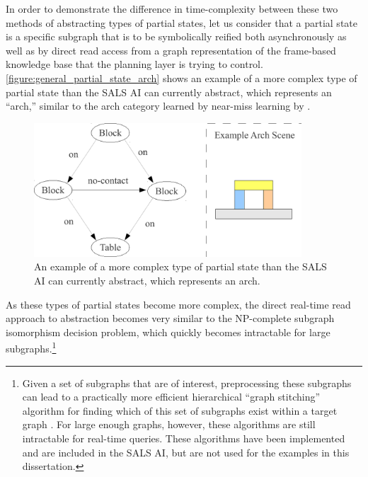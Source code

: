 In order to demonstrate the difference in time-complexity between
these two methods of abstracting types of partial states, let us
consider that a partial state is a specific subgraph that is to be
symbolically reified both asynchronously as well as by direct read
access from a graph representation of the frame-based knowledge base
that the planning layer is trying to control.
{\mbox{\autoref{figure:general_partial_state_arch}}} shows an example
of a more complex type of partial state than the SALS AI can currently
abstract, which represents an ``arch,'' similar to the arch category
learned by near-miss learning by \cite{winston:1970}.
\begin{figure}
\centering
\includegraphics[width=10cm]{gfx/general_partial_state_arch}
\caption[An example of a more complex type of partial state than the
  SALS AI can currently abstract, which represents an arch.]{An
  example of a more complex type of partial state than the SALS AI can
  currently abstract, which represents an arch.}
\label{figure:general_partial_state_arch}
\end{figure}
As these types of partial states become more complex, the direct
real-time read approach to abstraction becomes very similar to the
NP-complete subgraph isomorphism decision problem, which quickly
becomes intractable for large subgraphs.\footnote{Given a set of
  subgraphs that are of interest, preprocessing these subgraphs can
  lead to a practically more efficient hierarchical ``graph
  stitching'' algorithm for finding which of this set of subgraphs
  exist within a target graph \cite[]{messmer:1995,messmer:2000}.  For
  large enough graphs, however, these algorithms are still intractable
  for real-time queries.  These algorithms have been implemented and
  are included in the SALS AI, but are not used for the examples in
  this dissertation.}

